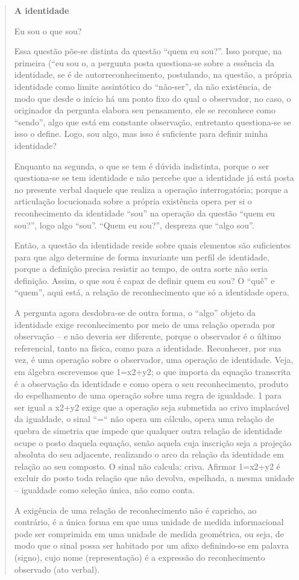 \begin{quote}\small
\textbf{A identidade}

Eu sou o que sou?

Essa questão põe-se distinta da questão “quem eu sou?”. Isso porque, na primeira (“eu sou o, a pergunta posta
questiona-se sobre a essência da identidade, se é de autorreconhecimento, postulando, na questão, a própria identidade
como limite assintótico do “não-ser”, da não existência, de modo que desde o início há um ponto fixo do qual o
observador, no caso, o originador da pergunta elabora seu pensamento, ele se reconhece como “sendo”, algo que está em
constante observação, entretanto questiona-se se isso o define. Logo, sou algo, mas isso é suficiente para definir
minha identidade?

Enquanto na segunda, o que se tem é dúvida indistinta, porque o ser questiona-se se tem identidade e não percebe que a
identidade já está posta no presente verbal daquele que realiza a operação interrogatória; porque a articulação
locucionada sobre a própria existência opera per si o reconhecimento da identidade “sou” na operação da questão “quem
eu sou?”, logo algo “sou”. “Quem eu sou?”, despreza que “algo sou”.

Então, a questão da identidade reside sobre quais elementos são suficientes para que algo determine de forma invariante
um perfil de identidade, porque a definição precisa resistir ao tempo, de outra sorte não seria definição. Assim, o que
sou é capaz de definir quem eu sou? O “quê” e “quem”, aqui está, a relação de reconhecimento que só a identidade opera.

A pergunta agora desdobra-se de outra forma, o “algo” objeto da identidade exige reconhecimento por meio de uma relação
operada por observação – e não deveria ser diferente, porque o observador é o último referencial, tanto na física, como
para a identidade. Reconhecer, por sua vez, é uma operação sobre o observador, uma operação de identidade. Veja, em
álgebra escrevemos que 1=x2+y2; o que importa da equação transcrita é a observação da identidade e como opera o seu
reconhecimento, produto do espelhamento de uma operação sobre uma regra de igualdade. 1 para ser igual a x2+y2 exige que
a operação seja submetida ao crivo implacável da igualdade, o sinal “=“ não opera um cálculo, opera uma relação de
quebra de simetria que impede que qualquer outra relação de identidade ocupe o posto daquela equação, senão aquela cuja
inscrição seja a projeção absoluta do seu adjacente, realizando o arco da relação da identidade em relação ao seu
composto. O sinal não calcula: criva. Afirmar 1=x2+y2 é excluir do posto toda relação que não devolva, espelhada, a
mesma unidade – igualdade como seleção única, não como conta.

A exigência de uma relação de reconhecimento não é capricho, ao contrário, é a única forma em que uma unidade de medida
informacional pode ser comprimida em uma unidade de medida geométrica, ou seja, de modo que o sinal possa ser habitado
por um afixo definindo-se em palavra (signo), cujo nome (representação) é a expressão do reconhecimento observado (ato
verbal).
\end{quote}

